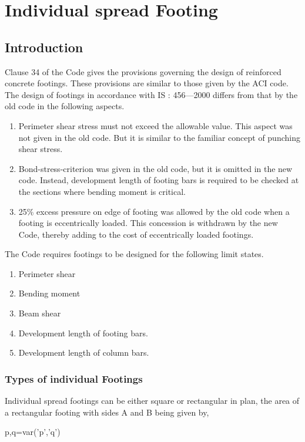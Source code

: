 \documentclass{book}
\begin{document}
\chapter{Individual spread Footing}
\section{Introduction}
Clause 34 of the Code gives the provisions governing the design of reinforced concrete footings. These provisions are similar to those given by the ACI code. The design of footings in accordance with IS : 456—2000 differs from that by the old code in the following aspects.

\begin{enumerate}
\item Perimeter shear stress must not exceed the allowable value. This aspect was not
given in the old code. But it is similar to the familiar concept of punching shear
stress.

\item Bond-stress-criterion was given in the old code, but it is omitted in the new code.
Instead, development length of footing bars is required to be checked at the sections
where bending moment is critical.

\item 25\% excess pressure on edge of footing was allowed by the old code when a footing
 is eccentrically loaded. This concession is withdrawn by the new Code, thereby
adding to the cost of eccentrically loaded footings.

\end{enumerate}
The Code requires footings to be designed for the following limit states.

\begin{enumerate}
\item Perimeter shear
\item Bending moment
\item Beam shear
\item  Development length of footing bars.
\item Development length of column bars.
\end{enumerate}

\subsection{Types of individual Footings}
Individual spread footings can be either square or rectangular in plan, the area of a rectangular footing with sides A and B being given by,
\begin{sagesilent}
    p,q=var('p','q')
\end{sagesilent}
\end{document}
